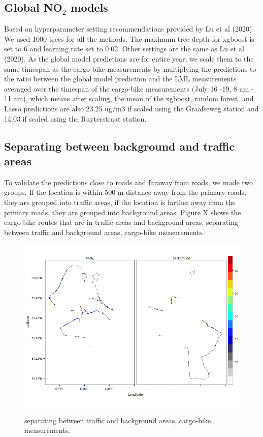 \documentclass{article}
\begin{document}
\subsection{Global NO$_2$ models}
Based on hyperparameter setting recommendations provided by Lu et al (2020) We used 1000 trees for all the methods. The maximum tree depth for xgboost is set to 6 and learning rate set to 0.02. Other settings are the same as Lu et al (2020). As the global model predictions are for entire year, we scale them to the same timespan as the cargo-bike measurements by multiplying the predictions to the ratio between the global model prediction and the LML measurements averaged over the timespan of the cargo-bike measurements (July 16 -19, 8 am - 11 am), which means after scaling, the mean of the xgboost, random forest, and Lasso predictions are also 23.25 ug/m3 if scaled using the Graafseweg station and 14.03 if scaled using the Ruyterstraat station.   


\subsection{Separating between background and traffic areas}
To validate the predictions close to roads and faraway from roads, we made two groups. If the location is within 500 m distance away from the primary roads, they are grouped into traffic areas, if the location is farther away from the primary roads, they are grouped into background areas. Figure X shows the cargo-bike routes that are in traffic areas and background areas. 
separating between traffic and background areas, cargo-bike measurements.
\begin{figure}
    \includegraphics[width=\linewidth]{f2.png}
    \label{seperate}
    \caption {separating between traffic and background areas, cargo-bike measurements.}
\end{figure}
\end{document}

